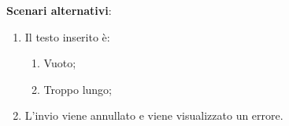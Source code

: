 \textbf{Scenari alternativi}:
\begin{enumerate}
    \item Il testo inserito è:
    \begin{enumerate}
        \item Vuoto;
        \item Troppo lungo;
    \end{enumerate}
    \item L'invio viene annullato e viene visualizzato un errore.
\end{enumerate}